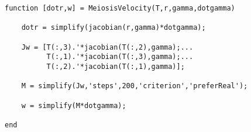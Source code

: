 \begin{lstlisting}[frame=lines,style=Matlab-editor,basicstyle = \mlttfamily, caption=MEIOSIS Velocity Calculator]
function [dotr,w] = MeiosisVelocity(T,r,gamma,dotgamma)

    dotr = simplify(jacobian(r,gamma)*dotgamma);

    Jw = [T(:,3).'*jacobian(T(:,2),gamma);...
          T(:,1).'*jacobian(T(:,3),gamma);...
          T(:,2).'*jacobian(T(:,1),gamma)];

    M = simplify(Jw,'steps',200,'criterion','preferReal');

    w = simplify(M*dotgamma);

end
\end{lstlisting}
